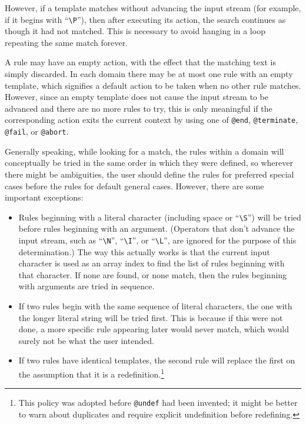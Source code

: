 However, if a template matches without advancing the input stream (for
example, if it begins with ``\verb/\P/''), then after executing its action,
the search continues as though it had not matched.  This is necessary to
avoid hanging in a loop repeating the same match forever.

A rule may have an empty action, with the effect that the matching text is
simply discarded.  In each domain there may be at most one rule with an
empty template, which signifies a default action to be taken when no other
rule matches.  However, since an empty template does not cause the input
stream to be advanced and there are no more rules to try, this is only
meaningful if the corresponding action exits the current context by using
one of \verb/@end/, \verb/@terminate/, \verb/@fail/, or \verb/@abort/.

Generally speaking, while looking for a match, the rules within a domain will
conceptually be tried in the same order in which they were defined, so
wherever there might be ambiguities, the user should define the rules
for preferred special cases before the rules for default general cases.
However, there are some important exceptions:
\begin{itemize}
\item Rules beginning with a literal character (including space or
``\verb/\S/'') will be tried before rules beginning with an argument.
(Operators that don't advance the input stream, such as ``\verb/\N/'',
``\verb/\I/'', or ``\verb/\L/'', are ignored for the purpose of this
determination.)  The way this actually works is that the current input
character is used as an array index to find the list of rules beginning
with that character.  If none are found, or none match, then the rules
beginning with arguments are tried in sequence.

\item If two rules begin with the same sequence of literal characters,
the one with the longer literal string will be tried first.  This is
because if this were not done, a more specific rule appearing later
would never match, which would surely not be what the user intended.

\item If two rules have identical templates, the second rule will replace the
first on the assumption that it is a redefinition.\footnote{This policy
was adopted before {\tt @undef} had been invented; it might be better to
warn about duplicates and require explicit undefinition before redefining.}
\end{itemize}

